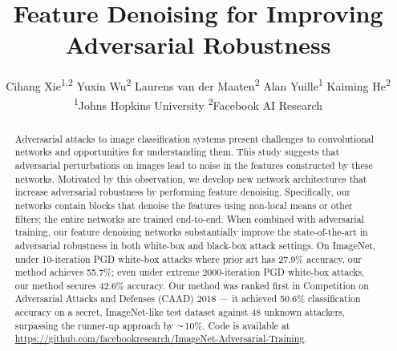 \documentclass[10pt,twocolumn,letterpaper]{article}
\newcommand{\app}{\raise.17ex\hbox{$\scriptstyle\sim$}}
\begin{document}
\title{Feature Denoising for Improving Adversarial Robustness}

\author{
Cihang Xie\textsuperscript{1,2}\footnotemark \qquad
Yuxin Wu\textsuperscript{2} \qquad
Laurens van der Maaten\textsuperscript{2} \qquad
Alan Yuille\textsuperscript{1} \qquad
Kaiming He\textsuperscript{2} \vspace{.3em}\\
\textsuperscript{1}Johns Hopkins University \qquad\qquad \textsuperscript{2}Facebook AI Research
\vspace{-.5em}
}

\maketitle
 \renewcommand*{\thefootnote}{\fnsymbol{footnote}}
 \setcounter{footnote}{1}
 \renewcommand*{\thefootnote}{\arabic{footnote}}
 \setcounter{footnote}{0}





\begin{abstract}
\vspace{-0.3cm}
Adversarial attacks to image classification systems present challenges to convolutional networks and opportunities for understanding them.
This study suggests that adversarial perturbations on images lead to noise in the features constructed by these networks. Motivated by this observation, we develop new network architectures that increase adversarial robustness by performing feature denoising. Specifically, our networks contain blocks that denoise the features using non-local means or other filters; the entire networks are trained end-to-end. When combined with adversarial training, our feature denoising networks substantially improve the state-of-the-art in adversarial robustness in both white-box and black-box attack settings.
On ImageNet, under 10-iteration PGD white-box attacks where prior art has 27.9\% accuracy, 
our method achieves 55.7\%; even under extreme 2000-iteration PGD white-box attacks, our method secures 42.6\% accuracy.
Our method was ranked first in Competition on Adversarial Attacks and Defenses (CAAD) 2018 --- it achieved 50.6\% classification accuracy on a secret, ImageNet-like test dataset against 48 unknown attackers, surpassing the runner-up approach by $\app$10\%. Code is available at \url{https://github.com/facebookresearch/ImageNet-Adversarial-Training}.
\end{abstract}
\end{document}

